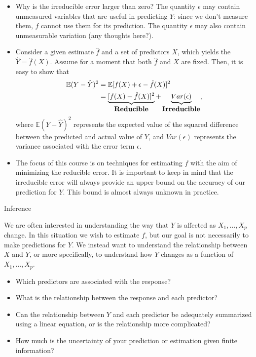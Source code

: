\documentclass[10pt,a4paper]{beamer}
\begin{document}
\begin{frame}{}

\begin{itemize}\small
  \item Why is the irreducible error larger than zero? The quantity $\epsilon$ may contain unmeasured variables that are useful in predicting $Y$: since we don't
measure them, $f$ cannot use them for its prediction. The quantity $\epsilon$ may also contain unmeasurable variation (any thoughts here?).
  \item Consider a given estimate $\hat{f}$ and a set of predictors $X$, which yields the
$\hat{Y} = \hat{f}(X)$. Assume for a moment that both $\hat{f}$ and $X$ are fixed.
Then, it is easy to show that
\begin{equation}\label{Reducible_Irrededucible_error}
\begin{aligned}
  \mathbb{E}(Y-\hat{Y})^2 &= \mathbb{E}[f(X)+\epsilon - \hat{f}(X)]^2\\
  &=\underbrace{[f(X)-\hat{f}(X)]^2}_{\mbox{\textbf{Reducible}}} + \underbrace{Var(\epsilon)}_{\mbox{\textbf{Irreducible}}},
\end{aligned}
\end{equation}
where $\mathbb{E}(Y-\hat{Y})^2$ represents the expected value of the squared difference between the predicted and actual value of $Y$, and $Var(\epsilon)$ represents the variance associated with the error term $\epsilon$.
  \item The focus of this course is on techniques for estimating $f$ with the aim of
minimizing the reducible error. It is important to keep in mind that the
irreducible error will always provide an upper bound on the accuracy of
our prediction for $Y$. This bound is almost always unknown in practice.
\end{itemize}

\end{frame}


\begin{frame}{Inference}

We are often interested in understanding the way that $Y$ is affected as
$X_1,\dots,X_p$ change. In this situation we wish to estimate $f$, but our goal is
not necessarily to make predictions for $Y$. We instead want to understand
the relationship between $X$ and $Y$, or more specifically, to understand how
$Y$ changes as a function of $X_1,\dots,X_p$.
\begin{itemize}
  \item Which predictors are associated with the response?
  \item What is the relationship between the response and each predictor?
  \item Can the relationship between $Y$ and each predictor be adequately summarized using a linear equation, or is the relationship more complicated?
  \item How much is the uncertainty of your prediction or estimation given finite information? 
\end{itemize}
\end{frame}
\end{document}
